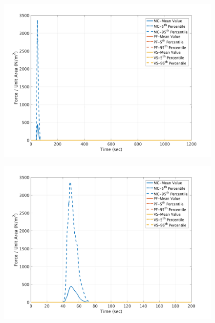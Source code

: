 \documentclass[a4paper,10pt]{article}
\begin{document}
\begin{figure}[H]
	\begin{minipage}[b]{0.5\linewidth}
	\centering
    \includegraphics[width=1\textwidth]{NetFAll/NetF10All.png}     
        \label{fig:NF10}
	\end{minipage}
	\begin{minipage}[b]{0.5\linewidth}
	\centering
    \includegraphics[width=1\textwidth]{NetFAll/NetF10All_z.png}
        \label{fig:NF10zoom}
	\end{minipage}
	

\end{figure}
\end{document}
